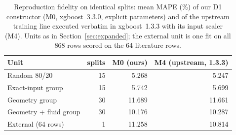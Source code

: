 \documentclass[11pt,a4paper]{article}
\begin{document}
\begin{table}[htbp]
\centering\small
\caption{Reproduction fidelity on identical splits: mean MAPE (\%) of our D1
constructor (M0, xgboost~3.3.0, explicit parameters) and of the upstream
training line executed verbatim in xgboost~1.3.3 with its input scaler (M4).
Units as in Section~\ref{sec:expanded}; the external unit is one fit on all
868 rows scored on the 64 literature rows.}
\label{tab:fidelity}
\begin{tabular}{lrrr}
\toprule
Unit & splits & M0 (ours) & M4 (upstream, 1.3.3) \\
\midrule
Random 80/20 & 15 & 5.268 & 5.247 \\
Exact-input group & 15 & 5.742 & 5.699 \\
Geometry group & 30 & 11.689 & 11.661 \\
Geometry + fluid group & 30 & 10.176 & 10.287 \\
External (64 rows) & 1 & 11.258 & 10.814 \\
\bottomrule
\end{tabular}
\end{table}
\end{document}
